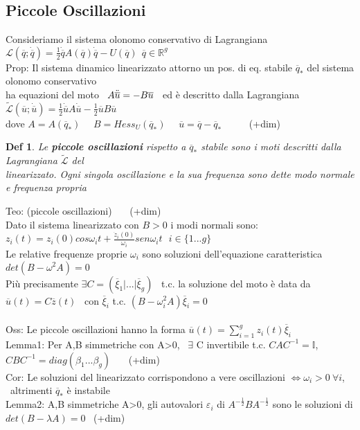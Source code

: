 \documentclass{article}
\theoremstyle{unnumbered}
\newtheorem* {theoremT}{Def}
\theoremstyle{unnumbered1}
\newenvironment{defi}{\begin{gBox}\begin{theoremT}}{\end{theoremT}\end{gBox}}
\begin{document}
\subsection{Piccole Oscillazioni}
%
Consideriamo il sistema olonomo conservativo di Lagrangiana \ \ $\mathcal{L}(\overline{q};\dot{\overline{q}})=\frac{1}{2}\dot{\overline{q}}A(\overline{q})\Dot{\overline{q}} -U(\overline{q}) \ \ \overline{q}\in\mathbb{R}^g$\\
Prop: Il sistema dinamico linearizzato attorno  un pos.\! di eq.\! stabile $\overline{q}_*$ del sistema olonomo conservativo\\
\phantom{Prop: }ha equazioni del moto \ $A\Ddot{\overline{u}}= -B\overline{u}$ \ ed è descritto dalla Lagrangiana \ $\widetilde{\mathcal{L}}(\overline{u};\dot{\overline{u}})=\frac{1}{2}\Dot{\overline{u}}A\Dot{\overline{u}} -\frac{1}{2}\overline{u}B\overline{u}$ \\
\phantom{Prop: }dove $A=A(\overline{q}_*)$ \ \ $B= Hess_U(\overline{q}_*)$ \ \ $\overline{u}=\overline{q}-\overline{q}_*$ \ \ \ \ \ (+dim) \newpage  %
%
%
%
\begin{defi}
Le \textbf{piccole oscillazioni} rispetto a $\overline{q}_*$ stabile sono i moti descritti dalla Lagrangiana $\widetilde{\mathcal{L}}$ del\\ linearizzato.
Ogni singola oscillazione e la sua frequenza sono dette modo normale e frequenza propria
\end{defi}
%
%
%
Teo: (piccole oscillazioni) \ \ \ (+dim)\\
Dato il sistema linearizzato con $B>0$ i modi normali sono: \ \ $z_i(t)=z_i(0)cos\omega_it+\frac{\dot{z}_i(0)
}{\omega_i}sen\omega_it \ \ \ i\in\{1...g\}$ \\
Le relative frequenze proprie $\omega_i$ sono soluzioni dell'equazione caratteristica \ $det(B-\omega^2A)=0$ \\
Più precisamente $\exists C=(\overline{\xi}_1|...|\overline{\xi}_g)$ \ t.c. la soluzione del moto è data da $\overline{u}(t)=C\overline{z}(t)$ \ con $\overline{\xi}_i$ t.c. $(B-\omega_i^2A)\overline{\xi}_i=0$\\ \\
%
%
%
Oss: Le piccole oscillazioni hanno la forma $\overline{u}(t)=\sum_{i=1}^gz_i(t)\overline{\xi}_i$\\
Lemma1: Per A,B simmetriche con A>0, \ $\exists$ C invertibile t.c. $CAC^{-1}= \mathbb{I} $, \ $CBC^{-1}=diag(\beta_1...\beta_g)$ \ \ \ (+dim)\\
Cor: Le soluzioni del linearizzato corrispondono a vere oscillazioni $\Longleftrightarrow\omega_i>0 \ \forall i$, \ altrimenti $\overline{q}_*$ è instabile\\
Lemma2: A,B simmetriche A>0, gli autovalori $\varepsilon_i$ di $A^{-\frac{1}{2}}BA^{-\frac{1}{2}}$ sono le soluzioni di $det(B-\lambda A)=0$ \ (+dim)\\ 
\end{document}
